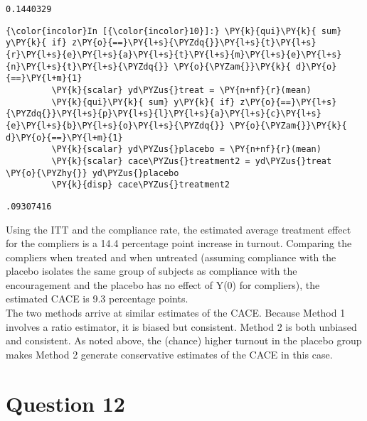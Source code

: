 \documentclass[11pt,notitlepage]{article}\usepackage[]{graphicx}\usepackage[]{color}
\makeatletter
\newenvironment{kframe}{%
 \def\at@end@of@kframe{}%
 \ifinner\ifhmode%
  \def\at@end@of@kframe{\end{minipage}}%
  \begin{minipage}{\columnwidth}%
 \fi\fi%
 \def\FrameCommand##1{\hskip\@totalleftmargin \hskip-\fboxsep
 \colorbox{shadecolor}{##1}\hskip-\fboxsep
     \hskip-\linewidth \hskip-\@totalleftmargin \hskip\columnwidth}%
 \MakeFramed {\advance\hsize-\width
   \@totalleftmargin\z@ \linewidth\hsize
   \@setminipage}}%
 {\par\unskip\endMakeFramed%
 \at@end@of@kframe}
\newenvironment{knitrout}{}{} %
\makeatother
\begin{document}
\begin{enumerate}[a)]
\begin{knitrout}
\begin{kframe}
    \begin{Verbatim}[commandchars=\\\{\}]
0.1440329
    \end{Verbatim}

    \begin{Verbatim}[commandchars=\\\{\}]
{\color{incolor}In [{\color{incolor}10}]:} \PY{k}{qui}\PY{k}{ sum} y\PY{k}{ if} z\PY{o}{==}\PY{l+s}{\PYZdq{}}\PY{l+s}{t}\PY{l+s}{r}\PY{l+s}{e}\PY{l+s}{a}\PY{l+s}{t}\PY{l+s}{m}\PY{l+s}{e}\PY{l+s}{n}\PY{l+s}{t}\PY{l+s}{\PYZdq{}} \PY{o}{\PYZam{}}\PY{k}{ d}\PY{o}{==}\PY{l+m}{1}
         \PY{k}{scalar} yd\PYZus{}treat = \PY{n+nf}{r}(mean)
         \PY{k}{qui}\PY{k}{ sum} y\PY{k}{ if} z\PY{o}{==}\PY{l+s}{\PYZdq{}}\PY{l+s}{p}\PY{l+s}{l}\PY{l+s}{a}\PY{l+s}{c}\PY{l+s}{e}\PY{l+s}{b}\PY{l+s}{o}\PY{l+s}{\PYZdq{}} \PY{o}{\PYZam{}}\PY{k}{ d}\PY{o}{==}\PY{l+m}{1}
         \PY{k}{scalar} yd\PYZus{}placebo = \PY{n+nf}{r}(mean)
         \PY{k}{scalar} cace\PYZus{}treatment2 = yd\PYZus{}treat \PY{o}{\PYZhy{}} yd\PYZus{}placebo
         \PY{k}{disp} cace\PYZus{}treatment2
\end{Verbatim}

    \begin{Verbatim}[commandchars=\\\{\}]
.09307416
    \end{Verbatim}
\end{kframe}
\end{knitrout}

Using the ITT and the compliance rate, the estimated average treatment effect for the compliers is a 14.4 percentage point increase in turnout. Comparing the compliers when treated and when untreated (assuming compliance with the placebo isolates the same group of subjects as compliance with the encouragement and the placebo has no effect of Y(0) for compliers), the estimated CACE is 9.3 percentage points. \\

The two methods arrive at similar estimates of the CACE. Because Method 1 involves a ratio estimator, it is biased but consistent.  Method 2 is both unbiased and consistent.  As noted above, the (chance) higher turnout in the placebo group makes Method 2 generate conservative estimates of the CACE in this case.
\end{enumerate}

\section*{Question 12}
\begin{knitrout}
\color{fgcolor}\begin{kframe}
\begin{verbatim}






\end{verbatim}
\end{kframe}
\end{knitrout}
\end{document}
